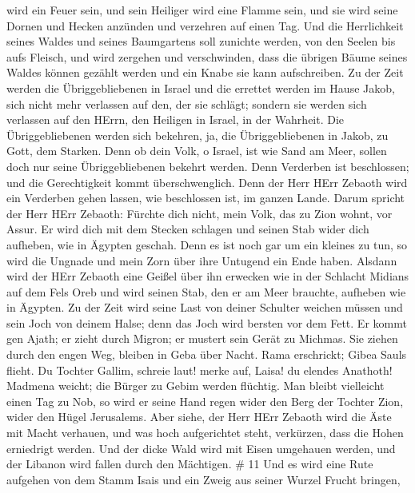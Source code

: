 wird ein Feuer sein, und sein Heiliger wird eine Flamme sein, und sie
wird seine Dornen und Hecken anzünden und verzehren auf einen Tag.
 Und die Herrlichkeit seines Waldes und seines Baumgartens
soll zunichte werden, von den Seelen bis aufs Fleisch, und wird zergehen
und verschwinden,  dass die übrigen Bäume seines Waldes
können gezählt werden und ein Knabe sie kann aufschreiben. 
Zu der Zeit werden die Übriggebliebenen in Israel und die errettet
werden im Hause Jakob, sich nicht mehr verlassen auf den, der sie
schlägt; sondern sie werden sich verlassen auf den HErrn, den Heiligen
in Israel, in der Wahrheit.  Die Übriggebliebenen werden
sich bekehren, ja, die Übriggebliebenen in Jakob, zu Gott, dem Starken.
 Denn ob dein Volk, o Israel, ist wie Sand am Meer, sollen
doch nur seine Übriggebliebenen bekehrt werden. Denn Verderben ist
beschlossen; und die Gerechtigkeit kommt überschwenglich. 
Denn der Herr HErr Zebaoth wird ein Verderben gehen lassen, wie
beschlossen ist, im ganzen Lande.  Darum spricht der Herr
HErr Zebaoth: Fürchte dich nicht, mein Volk, das zu Zion wohnt, vor
Assur. Er wird dich mit dem Stecken schlagen und seinen Stab wider dich
aufheben, wie in Ägypten geschah.  Denn es ist noch gar um
ein kleines zu tun, so wird die Ungnade und mein Zorn über ihre Untugend
ein Ende haben.  Alsdann wird der HErr Zebaoth eine Geißel
über ihn erwecken wie in der Schlacht Midians auf dem Fels Oreb und wird
seinen Stab, den er am Meer brauchte, aufheben wie in Ägypten.
 Zu der Zeit wird seine Last von deiner Schulter weichen
müssen und sein Joch von deinem Halse; denn das Joch wird bersten vor
dem Fett.  Er kommt gen Ajath; er zieht durch Migron; er
mustert sein Gerät zu Michmas.  Sie ziehen durch den engen
Weg, bleiben in Geba über Nacht. Rama erschrickt; Gibea Sauls flieht.
 Du Tochter Gallim, schreie laut! merke auf, Laisa! du
elendes Anathoth!  Madmena weicht; die Bürger zu Gebim
werden flüchtig.  Man bleibt vielleicht einen Tag zu Nob,
so wird er seine Hand regen wider den Berg der Tochter Zion, wider den
Hügel Jerusalems.  Aber siehe, der Herr HErr Zebaoth wird
die Äste mit Macht verhauen, und was hoch aufgerichtet steht, verkürzen,
dass die Hohen erniedrigt werden.  Und der dicke Wald wird
mit Eisen umgehauen werden, und der Libanon wird fallen durch den
Mächtigen. \# 11  Und es wird eine Rute aufgehen von dem
Stamm Isais und ein Zweig aus seiner Wurzel Frucht bringen, 
